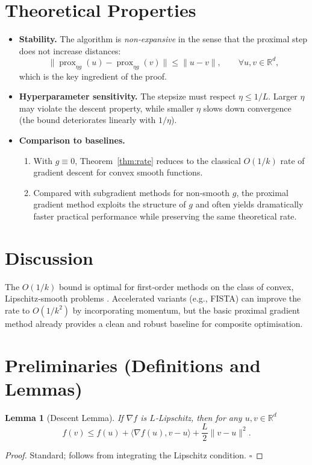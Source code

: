 \documentclass{article}
\newtheorem{lemma}{Lemma}
\newcommand{\prox}{\operatorname{prox}}
\newcommand{\R}{\mathbb{R}}
\begin{document}
\section*{Theoretical Properties}
\begin{itemize}
    \item \textbf{Stability.} The algorithm is \emph{non‑expansive} in the sense that the proximal step does not increase distances:
    \[
        \|\prox_{\eta g}(u)-\prox_{\eta g}(v)\|\le\|u-v\|,\qquad\forall u,v\in\R^{d},
    \]
    which is the key ingredient of the proof.
    \item \textbf{Hyperparameter sensitivity.} The stepsize must respect $\eta\le 1/L$. Larger $\eta$ may violate the descent property, while smaller $\eta$ slows down convergence (the bound deteriorates linearly with $1/\eta$).
    \item \textbf{Comparison to baselines.}
    \begin{enumerate}
        \item With $g\equiv0$, Theorem~\ref{thm:rate} reduces to the classical $O(1/k)$ rate of gradient descent for convex smooth functions.
        \item Compared with subgradient methods for non‑smooth $g$, the proximal gradient method exploits the structure of $g$ and often yields dramatically faster practical performance while preserving the same theoretical rate.
    \end{enumerate}
\end{itemize}

\section*{Discussion}
The $O(1/k)$ bound is optimal for first‑order methods on the class of convex, Lipschitz‑smooth problems \cite{nesterov1983}. Accelerated variants (e.g., FISTA) can improve the rate to $O(1/k^{2})$ by incorporating momentum, but the basic proximal gradient method already provides a clean and robust baseline for composite optimisation.

\newpage

\section*{Preliminaries (Definitions and Lemmas)}
\begin{lemma}[Descent Lemma]\label{lem:descent}
If $\nabla f$ is $L$‑Lipschitz, then for any $u,v\in\R^{d}$
\[
f(v)\le f(u)+\langle\nabla f(u),v-u\rangle+\frac{L}{2}\|v-u\|^{2}.
\]
\end{lemma}
\begin{proof}
Standard; follows from integrating the Lipschitz condition. \hfill $\square$
\end{proof}
\end{document}
